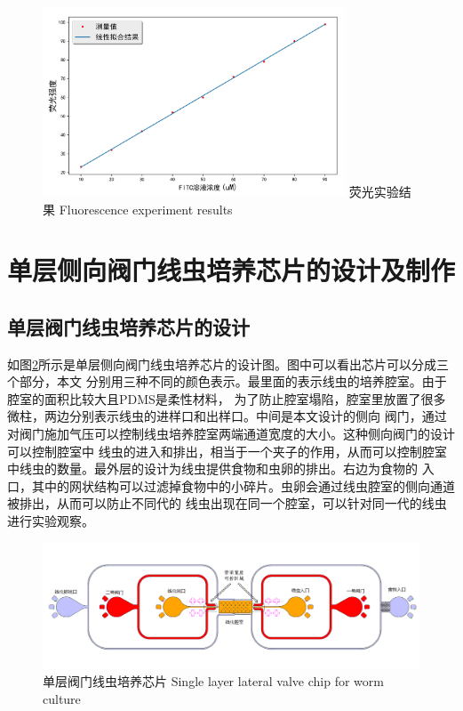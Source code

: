 	\begin{figure}[htbp]
	  \centering
	  \includegraphics[width=9cm]{figure/chap2/fluence.jpg}
	  \bicaption
		{荧光实验结果}
		{Fluorescence experiment results}
	  \label{fig:chap2:fluence}
	\end{figure}
\section{单层侧向阀门线虫培养芯片的设计及制作}
\subsection{单层阀门线虫培养芯片的设计}
    如图\ref{fig:chap2:singlelayer}所示是单层侧向阀门线虫培养芯片的设计图。图中可以看出芯片可以分成三个部分，本文
	分别用三种不同的颜色表示。最里面的表示线虫的培养腔室。由于腔室的面积比较大且PDMS是柔性材料，
	为了防止腔室塌陷，腔室里放置了很多微柱，两边分别表示线虫的进样口和出样口。中间是本文设计的侧向
	阀门，通过对阀门施加气压可以控制线虫培养腔室两端通道宽度的大小。这种侧向阀门的设计可以控制腔室中
	线虫的进入和排出，相当于一个夹子的作用，从而可以控制腔室中线虫的数量。最外层的设计为线虫提供食物和虫卵的排出。右边为食物的
	入口，其中的网状结构可以过滤掉食物中的小碎片。虫卵会通过线虫腔室的侧向通道被排出，从而可以防止不同代的
	线虫出现在同一个腔室，可以针对同一代的线虫进行实验观察。
\label{subsec:chipdesign}
	\begin{figure}[htbp]
	  \centering
	  \includegraphics[width=14cm]{figure/chap2/arch-chip.png}
	  \bicaption
		{单层阀门线虫培养芯片}
		{Single layer lateral valve chip for  worm culture}
	  \label{fig:chap2:singlelayer}
	\end{figure}
